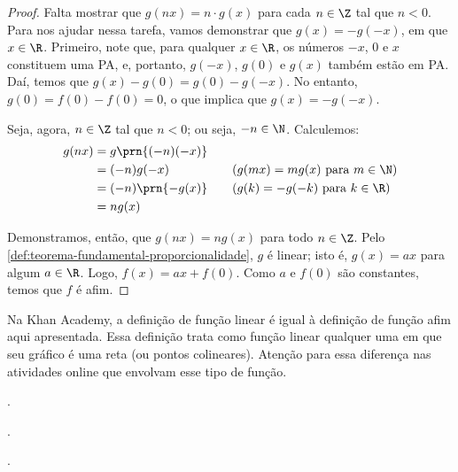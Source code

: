 \begin{proof}
	Falta mostrar que $g(nx) = n \cdot g(x)$ para cada $n \in \Z$ tal que $n < 0$.
	Para nos ajudar nessa tarefa, vamos demonstrar que $g(x) = -g(-x)$, em que $x \in \R$. 
	Primeiro, note que, para qualquer $x \in \R$, os números $-x$, $0$ e $x$
	constituem uma PA, e, portanto, $g(-x)$, $g(0)$ e $g(x)$ também estão em PA. Daí, temos que $g(x) - g(0) = 
	g(0)-g(-x)$. No entanto, $g(0) = f(0) - f(0) = 0$, o que implica que $g(x) = -g(-x)$.

	Seja, agora, $n \in \Z$ tal que $n < 0$; ou seja, $-n \in \N$. Calculemos:
	\begin{alignat*}{3}
		g(nx) &= g\prn{(-n)(-x)} &&  \\
		&= (-n)g(-x) && \quad\text{($g(mx) = mg(x)$ para $m\in\N$)} \\
		&= (-n)\prn{-g(x)} && \quad\text{($g(k) = -g(-k)$ para $k \in \R$)} \\
		&= ng(x)
	\end{alignat*}

	Demonstramos, então, que $g(nx) = ng(x)$ para todo $n \in \Z$. Pelo \ref{def:teorema-fundamental-proporcionalidade},
	$g$ é linear; isto é, $g(x) = ax$ para algum $a \in \R$. Logo, $f(x) = ax + f(0)$. Como $a$ e $f(0)$ são constantes,
	temos que $f$ é afim.

	
 \end{proof}

\begin{remark}
	Na Khan Academy, a definição de função linear é igual à definição de função afim aqui apresentada. Essa definição trata como função linear qualquer uma em que seu gráfico é uma reta (ou pontos colineares). Atenção para essa diferença nas atividades online que envolvam esse tipo de função.
\end{remark}

\begin{onlineact}
	.
\end{onlineact}

\begin{onlineact}
	.
\end{onlineact}

\begin{onlineact}
	.
\end{onlineact}